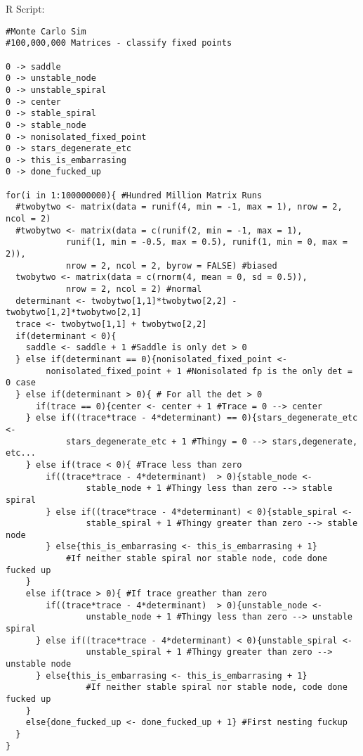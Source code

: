 \documentclass[11pt,answers]{exam}
\begin{document}
R Script:
\begin{verbatim}
#Monte Carlo Sim
#100,000,000 Matrices - classify fixed points

0 -> saddle
0 -> unstable_node
0 -> unstable_spiral
0 -> center
0 -> stable_spiral
0 -> stable_node
0 -> nonisolated_fixed_point
0 -> stars_degenerate_etc
0 -> this_is_embarrasing
0 -> done_fucked_up

for(i in 1:100000000){ #Hundred Million Matrix Runs
  #twobytwo <- matrix(data = runif(4, min = -1, max = 1), nrow = 2, ncol = 2)
  #twobytwo <- matrix(data = c(runif(2, min = -1, max = 1), 
            runif(1, min = -0.5, max = 0.5), runif(1, min = 0, max = 2)), 
            nrow = 2, ncol = 2, byrow = FALSE) #biased
  twobytwo <- matrix(data = c(rnorm(4, mean = 0, sd = 0.5)), 
            nrow = 2, ncol = 2) #normal
  determinant <- twobytwo[1,1]*twobytwo[2,2] - twobytwo[1,2]*twobytwo[2,1]
  trace <- twobytwo[1,1] + twobytwo[2,2]
  if(determinant < 0){
    saddle <- saddle + 1 #Saddle is only det > 0
  } else if(determinant == 0){nonisolated_fixed_point <- 
        nonisolated_fixed_point + 1 #Nonisolated fp is the only det = 0 case
  } else if(determinant > 0){ # For all the det > 0
      if(trace == 0){center <- center + 1 #Trace = 0 --> center
    } else if((trace*trace - 4*determinant) == 0){stars_degenerate_etc <- 
            stars_degenerate_etc + 1 #Thingy = 0 --> stars,degenerate, etc...
    } else if(trace < 0){ #Trace less than zero
        if((trace*trace - 4*determinant)  > 0){stable_node <- 
                stable_node + 1 #Thingy less than zero --> stable spiral
        } else if((trace*trace - 4*determinant) < 0){stable_spiral <- 
                stable_spiral + 1 #Thingy greater than zero --> stable node
        } else{this_is_embarrasing <- this_is_embarrasing + 1} 
            #If neither stable spiral nor stable node, code done fucked up
    }
    else if(trace > 0){ #If trace greather than zero
        if((trace*trace - 4*determinant)  > 0){unstable_node <- 
                unstable_node + 1 #Thingy less than zero --> unstable spiral
      } else if((trace*trace - 4*determinant) < 0){unstable_spiral <- 
                unstable_spiral + 1 #Thingy greater than zero --> unstable node
      } else{this_is_embarrasing <- this_is_embarrasing + 1} 
                #If neither stable spiral nor stable node, code done fucked up
    }
    else{done_fucked_up <- done_fucked_up + 1} #First nesting fuckup
  }
}
\end{verbatim}
\end{document}
